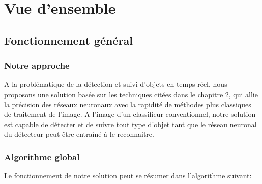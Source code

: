 \chapter{Vue d'ensemble}

	\section{Fonctionnement général}

		\subsection{Notre approche}
			A la problématique de la détection et suivi d'objets en temps réel, nous proposons une solution basée sur les techniques citées dans le chapitre 2, qui allie la précision des réseaux neuronaux avec la rapidité de méthodes plus classiques de traitement de l'image.
			A l'image d'un classifieur conventionnel, notre solution est capable de détecter et de suivre tout type d'objet tant que le réseau neuronal du détecteur peut être entraîné à le reconnaitre. 
			
			
		\subsection{Algorithme global}
			Le fonctionnement de notre solution peut se résumer dans l'algorithme suivant:
		

